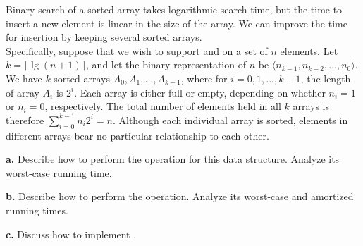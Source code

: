 Binary search of a sorted array takes logarithmic search time, but the 
time to insert a new element is linear in the size of the array. We can 
improve the time for insertion by keeping several sorted arrays.\\
Specifically, suppose that we wish to support  and 
 on a set of $n$ elements. Let $k = \lceil \lg (n+1) \rceil$, 
and let the binary representation of $n$ be $\langle n_{k-1}, n_{k-2}, ...,n_0 \rangle$. 
We have $k$ sorted arrays $A_0,A_1,...,A_{k-1}$, where for 
$i=0,1,...,k-1$, the length of array $A_i$ is $2^i$. Each array is either
full or empty, depending on whether $n_i = 1$ or $n_i = 0$, respectively. 
The total number of elements held in all $k$ arrays is therefore 
$\sum_{i=0}^{k-1}{n_i2^i}=n$. Although each individual array is sorted, 
elements in different arrays bear no particular relationship to each other.

\textbf{a.} Describe how to perform the  operation for this data 
structure. Analyze its worst-case running time.

\textbf{b.} Describe how to perform the  operation. Analyze its worst-case and amortized running times.

\textbf{c.} Discuss how to implement .